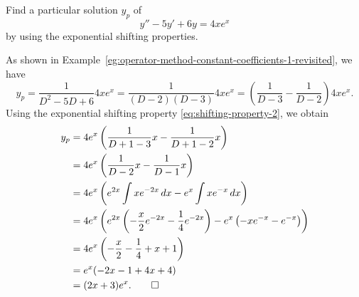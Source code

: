 \begin{example}\label{eg:shifting-properties}
	Find a particular solution $y_p$ of 
\[y''-5y'+6y= 4xe^{x}\] by using the exponential shifting properties.
\end{example}
\begin{solution}
As shown in Example~\ref{eg:operator-method-constant-coefficients-1-revisited}, we have
	\[y_p = \frac{1}{D^2-5D+6} 4xe^x = \frac{1}{(D-2)(D-3)} 4xe^x = \left(\frac{1}{D-3}-\frac{1}{D-2}\right) 4xe^x.\]
	Using the exponential shifting property \eqref{eq:shifting-property-2}, we obtain
		\[\begin{split}
			y_p& = 4e^x\left(\frac{1}{D+1-3}x-\frac{1}{D+1-2}x\right)\\
			&=4e^x\left(\frac{1}{D-2}x-\frac{1}{D-1}x\right)\\
			&=4e^x\left(e^{2x}\int xe^{-2x}\, dx - e^x\int xe^{-x}\,dx\right)\\
			&=4e^x\left(e^{2x}\left(-\frac{x}{2}e^{-2x} -\frac{1}{4}e^{-2x}\right) - e^x\left(-xe^{-x} -e^{-x}\right)\right)\\
			&=4e^x\left(-\frac{x}{2} -\frac{1}{4} +x +1\right)\\
			&=e^x(-2x-1+4x+4)\\
			&=(2x+3)e^x.\qedhere
		\end{split} 
		\]
\end{solution}



